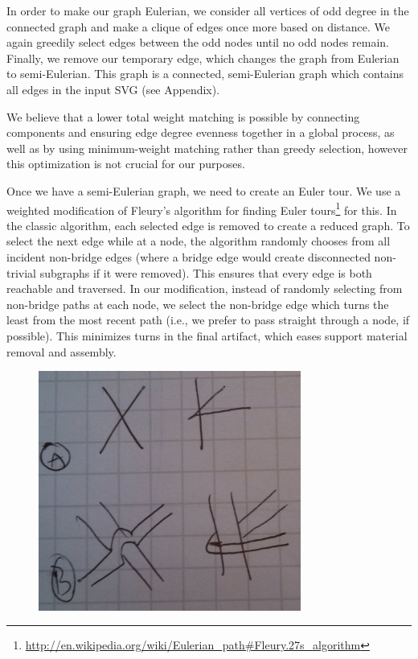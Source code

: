 In order to make our graph Eulerian, we consider all vertices of odd degree in the connected graph and make a clique of edges once more based on distance.  We again greedily select edges between the odd nodes until no odd nodes remain.  Finally, we remove our temporary edge, which changes the graph from Eulerian to semi-Eulerian.  This graph is a connected, semi-Eulerian graph which contains all edges in the input SVG (see Appendix).

We believe that a lower total weight matching is possible by connecting components and ensuring edge degree evenness together in a global process, as well as by using minimum-weight matching rather than greedy selection, however this optimization is not crucial for our purposes.

Once we have a semi-Eulerian graph, we need to create an Euler tour.  We use a weighted modification of Fleury's algorithm for finding Euler tours\footnote{\url{http://en.wikipedia.org/wiki/Eulerian_path\#Fleury.27s_algorithm}} for this.  In the classic algorithm, each selected edge is removed to create a reduced graph.  To select the next edge while at a node, the algorithm randomly chooses from all incident non-bridge edges (where a bridge edge would create disconnected non-trivial subgraphs if it were removed).  This ensures that every edge is both reachable and traversed.  In our modification, instead of randomly selecting from non-bridge paths at each node, we select the non-bridge edge which turns the least from the most recent path (i.e., we prefer to pass straight through a node, if possible).  This minimizes turns in the final artifact, which eases support material removal and assembly.

\begin{figure}[h!]
\centering
    \includegraphics[width=3.4in]{figures/placeholder/templates.jpg}
\caption{}
\label{fig:templates}
\end{figure}

